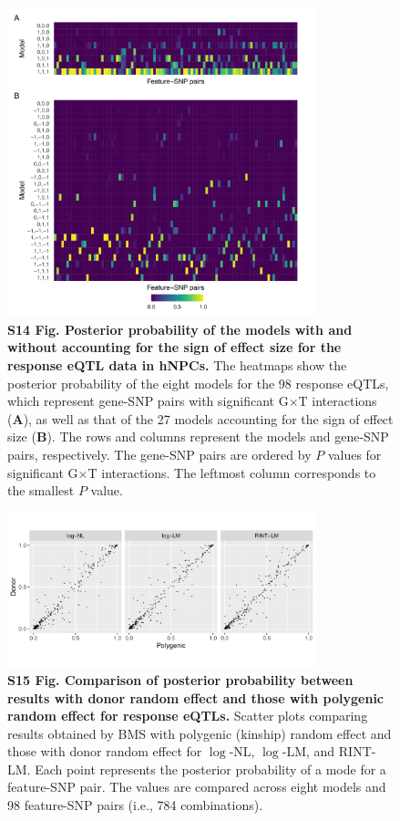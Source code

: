 \documentclass[11pt]{article}
\newcommand{\GxT}{G$\times$T\xspace}
\begin{document}
\begin{figure}[!ht]
\begin{center}
  \includegraphics[width=0.8\textwidth]{png/wntrna_hm.png}
\end{center}  
\caption{
  {\bf
    S14 Fig.
    Posterior probability of the models with and without accounting for the sign of effect size for the response eQTL data in hNPCs.}
The heatmaps show the posterior probability of the eight models for the 98 response eQTLs, which represent gene-SNP pairs with significant \GxT interactions (\textbf{A}), as well as that of the 27 models accounting for the sign of effect size (\textbf{B}).
The rows and columns represent the models and gene-SNP pairs, respectively. The gene-SNP pairs are ordered by $P$ values for significant \GxT interactions. The leftmost column corresponds to the smallest $P$ value.
}
\label{s-fig:wntrna-sign}
\end{figure}

\begin{figure}[!ht]
\begin{center}
  \includegraphics[width=0.8\textwidth]{png/wntrna_compare_pp.png}
\end{center}  
\caption{
  {\bf
    S15 Fig.
    Comparison of posterior probability between results with donor random effect and those with polygenic random effect for response eQTLs.}
Scatter plots comparing results obtained by BMS with polygenic (kinship) random effect and those with donor random effect for $\log$-NL, $\log$-LM, and RINT-LM. Each point represents the posterior probability of a mode for a feature-SNP pair. The values are compared across eight models and 98 feature-SNP pairs (i.e., 784 combinations).
}
\label{s-fig:wntrna-compare-pp}
\end{figure}
\end{document}
